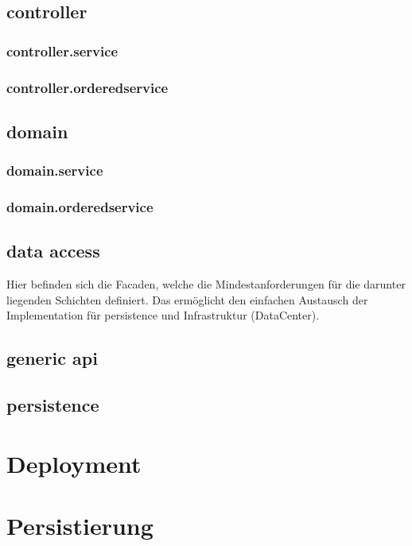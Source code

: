 \documentclass[11pt]{scrartcl}
\begin{document}
\subsection{controller}
\subsubsection{controller.service}
\subsubsection{controller.orderedservice}

\subsection{domain}
\subsubsection{domain.service}
\subsubsection{domain.orderedservice}

\subsection{data access}
Hier befinden sich die Facaden, welche die Mindestanforderungen für die darunter liegenden Schichten definiert. Das ermöglicht den einfachen Austausch der Implementation für persistence und Infrastruktur (DataCenter).


\subsection{generic api}

\subsection{persistence}

\section{Deployment}

\section{Persistierung}
\end{document}
